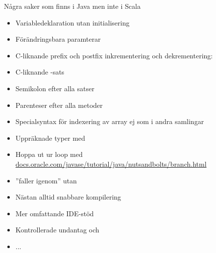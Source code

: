 \begin{Slide}{Några saker som finns i Java men inte i Scala}\SlideFontSmall
\vspace{-0.7em}\begin{multicols}{2}
\begin{itemize}
\item Variabledeklaration utan initialisering

\item Förändringsbara paramterar

\item C-liknande prefix och postfix inkrementering och dekrementering: 

\item C-liknande -sats

\item Semikolon efter alla satser

\item Parenteser efter alla metoder

\item Specialsyntax för indexering av array \code{[]} ej som i andra samlingar

\item Uppräknade typer med {\texttt{\bfseries{\color{eclipsepurple}{enum}}}}

\item Hoppa ut ur loop med  \\ \href{https://docs.oracle.com/javase/tutorial/java/nutsandbolts/branch.html}{docs.oracle.com/javase/tutorial/java/nutsandbolts/branch.html}

\item {} ''faller igenom'' utan 

\item Nästan alltid snabbare kompilering

\item Mer omfattande IDE-stöd

\item Kontrollerade undantag  och 

\item ...
\end{itemize}

\end{multicols}
\end{Slide}





